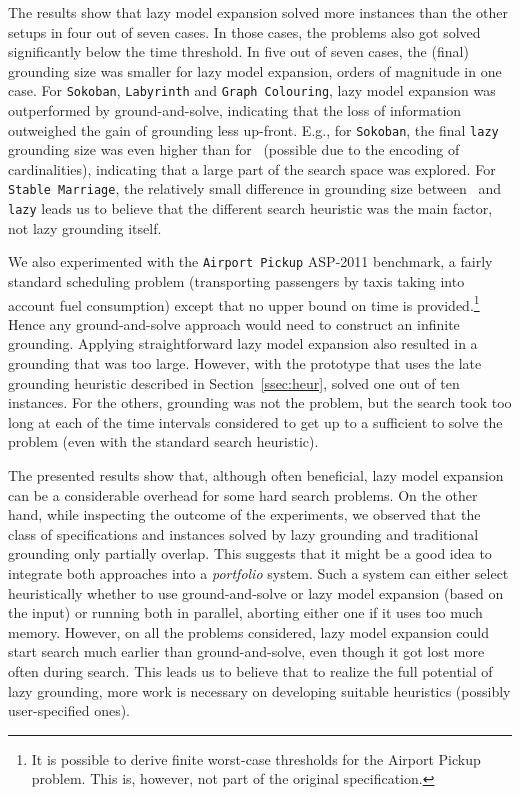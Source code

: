\documentclass[11pt]{article}
\newcommand{\logicname}[1]{\text{\sc #1}\xspace}
\newcommand{\idp}{\logicname{IDP}}
\theoremstyle{plain}
\theoremstyle{definition}
\theoremstyle{example_basic}
\theoremstyle{example_contd}
\theoremstyle{plain}
\newcommand{\stablemarriage}	{\texttt{Stable Marriage}\xspace}
\newcommand{\colouring}			{\texttt{Graph Colouring}\xspace}
\newcommand{\sokoban}			{\texttt{Sokoban}\xspace}
\newcommand{\labyrinth}			{\texttt{Labyrinth}\xspace}
\newcommand{\airportpickup}		{\texttt{Airport Pickup}\xspace}
\newcommand{\change}[1]{#1}
\begin{document}
The results show that lazy model expansion solved more instances than the other setups in four out of seven cases. In those cases, the problems also got solved significantly below the time threshold. In five out of seven cases, the (final) grounding size was smaller for lazy model expansion, orders of magnitude in one case. 
For \sokoban, \labyrinth and \colouring, lazy model expansion was outperformed by ground-and-solve, indicating that the loss of information outweighed the gain of grounding less up-front. E.g., for \sokoban, the  final \texttt{lazy} grounding size was even higher than for \gs\ (possible due to the \FO encoding of cardinalities), indicating that a large part of the search space was explored.
For \stablemarriage, the relatively small difference in grounding size between \gs\ and \texttt{lazy} leads us to believe that the different search heuristic was the main factor, not lazy grounding itself.

We also experimented with the \airportpickup ASP-2011 benchmark, a
fairly standard scheduling problem (transporting passengers by taxis
taking into account fuel consumption) except that no upper bound on
time is provided.\footnote{\change{It is possible to derive finite
    worst-case thresholds for the Airport Pickup problem. This is,
    however, not part of the original specification.}} Hence any
ground-and-solve approach would need to construct an infinite
grounding. Applying straightforward lazy model expansion also resulted
in a grounding that was too large. \change{However, with the prototype that uses the late grounding heuristic described in
  Section~\ref{ssec:heur},}
\idp solved one out of ten instances. For the others, grounding was not the problem, but the search took too long at each of the time intervals  considered to get up to a sufficient  to solve the problem (even with the standard search heuristic).

The presented results show that, although often beneficial, lazy model expansion can be a considerable overhead for some hard search problems. \change{On the other hand, while inspecting the outcome of the experiments, we observed that the class of specifications and instances solved by lazy grounding and traditional grounding only partially overlap. This suggests that it might be a good idea to integrate both approaches into a \emph{portfolio} system. Such a system can either select heuristically whether to use ground-and-solve or lazy model expansion (based on the input) or running both in parallel, aborting either one if it uses too much memory}. However, on all the problems considered, lazy model expansion could start search much earlier than ground-and-solve, even though it got lost more often during search. This leads us to believe that  to realize the  full potential of lazy grounding, more work is necessary on developing suitable heuristics (possibly user-specified ones).
\end{document}
